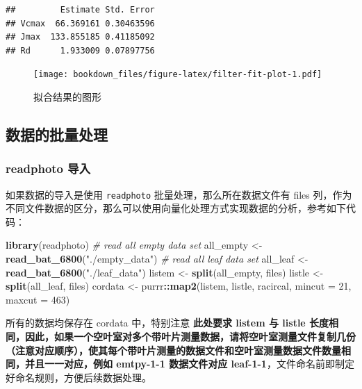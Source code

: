 \documentclass[
]{krantz}
\makeatletter
\newenvironment{Shaded}{\begin{snugshade}}{\end{snugshade}}
\newcommand{\CommentTok}[1]{\textcolor[rgb]{0.56,0.35,0.01}{\textit{#1}}}
\newcommand{\DataTypeTok}[1]{\textcolor[rgb]{0.13,0.29,0.53}{#1}}
\newcommand{\DecValTok}[1]{\textcolor[rgb]{0.00,0.00,0.81}{#1}}
\newcommand{\KeywordTok}[1]{\textcolor[rgb]{0.13,0.29,0.53}{\textbf{#1}}}
\newcommand{\NormalTok}[1]{#1}
\newcommand{\OperatorTok}[1]{\textcolor[rgb]{0.81,0.36,0.00}{\textbf{#1}}}
\newcommand{\StringTok}[1]{\textcolor[rgb]{0.31,0.60,0.02}{#1}}
\newenvironment{kframe}{%
\medskip{}
\setlength{\fboxsep}{.8em}
 \def\at@end@of@kframe{}%
 \ifinner\ifhmode%
  \def\at@end@of@kframe{\end{minipage}}%
  \begin{minipage}{\columnwidth}%
 \fi\fi%
 \def\FrameCommand##1{\hskip\@totalleftmargin \hskip-\fboxsep
 \colorbox{shadecolor}{##1}\hskip-\fboxsep
     \hskip-\linewidth \hskip-\@totalleftmargin \hskip\columnwidth}%
 \MakeFramed {\advance\hsize-\width
   \@totalleftmargin\z@ \linewidth\hsize
   \@setminipage}}%
 {\par\unskip\endMakeFramed%
 \at@end@of@kframe}
\renewenvironment{Shaded}{\begin{kframe}}{\end{kframe}}
\makeatother
\begin{document}
\begin{verbatim}
##         Estimate Std. Error
## Vcmax  66.369161 0.30463596
## Jmax  133.855185 0.41185092
## Rd      1.933009 0.07897756
\end{verbatim}

\begin{figure}
\centering
\texttt{[image: bookdown\_files/figure-latex/filter-fit-plot-1.pdf]}
\caption{\label{fig:filter-fit-plot}拟合结果的图形}
\end{figure}

\hypertarget{racirbatch}{%
\subsection{数据的批量处理}\label{racirbatch}}

\hypertarget{imbyphoto}{%
\subsubsection{readphoto 导入}\label{imbyphoto}}

如果数据的导入是使用 \texttt{readphoto} 批量处理，那么所在数据文件有 files 列，作为不同文件数据的区分，那么可以使用向量化处理方式实现数据的分析，参考如下代码：

\begin{Shaded}
\begin{Highlighting}[]
\KeywordTok{library}\NormalTok{(readphoto)}
\CommentTok{\# read all empty data set}
\NormalTok{all\_empty \textless{}{-}}\StringTok{ }\KeywordTok{read\_bat\_6800}\NormalTok{(}\StringTok{"./empty\_data"}\NormalTok{)}
\CommentTok{\# read all leaf data set}
\NormalTok{all\_leaf \textless{}{-}}\StringTok{ }\KeywordTok{read\_bat\_6800}\NormalTok{(}\StringTok{"./leaf\_data"}\NormalTok{)}
\NormalTok{listem  \textless{}{-}}\StringTok{  }\KeywordTok{split}\NormalTok{(all\_empty, files)}
\NormalTok{listle \textless{}{-}}\StringTok{  }\KeywordTok{split}\NormalTok{(all\_leaf, files)}
\NormalTok{cordata \textless{}{-}}\StringTok{ }\NormalTok{purrr}\OperatorTok{::}\KeywordTok{map2}\NormalTok{(listem, listle, racircal, }\DataTypeTok{mincut =} \DecValTok{21}\NormalTok{, }\DataTypeTok{maxcut =} \DecValTok{463}\NormalTok{)}
\end{Highlighting}
\end{Shaded}

所有的数据均保存在 cordata 中，特别注意 \textbf{此处要求 listem 与 listle 长度相同，因此，如果一个空叶室对多个带叶片测量数据，请将空叶室测量文件复制几份（注意对应顺序），使其每个带叶片测量的数据文件和空叶室测量数据文件数量相同，并且一一对应，例如 emtpy-1-1 数据文件对应 leaf-1-1}，文件命名前即制定好命名规则，方便后续数据处理。
\end{document}

